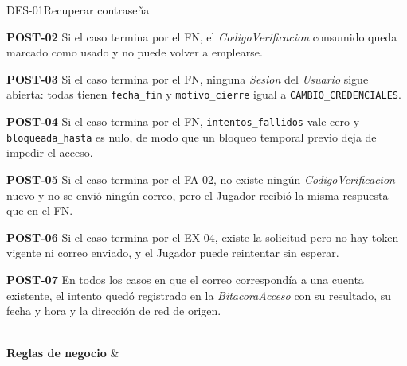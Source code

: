 \begin{fichacu}{DES-01}{Recuperar contraseña}
{\begin{cureglas}
      \item \textbf{\mbox{POST-02}} Si el caso termina por el FN, el \textit{CodigoVerificacion} consumido queda marcado como usado y no puede volver a emplearse.
      \item \textbf{\mbox{POST-03}} Si el caso termina por el FN, ninguna \textit{Sesion} del \textit{Usuario} sigue abierta: todas tienen \texttt{fecha\_\allowbreak{}fin} y \texttt{motivo\_\allowbreak{}cierre} igual a \texttt{CAMBIO\_\allowbreak{}CREDENCIALES}.
      \item \textbf{\mbox{POST-04}} Si el caso termina por el FN, \texttt{intentos\_\allowbreak{}fallidos} vale cero y \texttt{bloqueada\_\allowbreak{}hasta} es nulo, de modo que un bloqueo temporal previo deja de impedir el acceso.
      \item \textbf{\mbox{POST-05}} Si el caso termina por el \mbox{FA-02}, no existe ningún \textit{CodigoVerificacion} nuevo y no se envió ningún correo, pero el Jugador recibió la misma respuesta que en el FN.
      \item \textbf{\mbox{POST-06}} Si el caso termina por el \mbox{EX-04}, existe la solicitud pero no hay token vigente ni correo enviado, y el Jugador puede reintentar sin esperar.
      \item \textbf{\mbox{POST-07}} En todos los casos en que el correo correspondía a una cuenta existente, el intento quedó registrado en la \textit{BitacoraAcceso} con su resultado, su fecha y hora y la dirección de red de origen.
    \end{cureglas}} \\ \hline
  \textbf{Reglas de negocio} & 
\end{fichacu}
